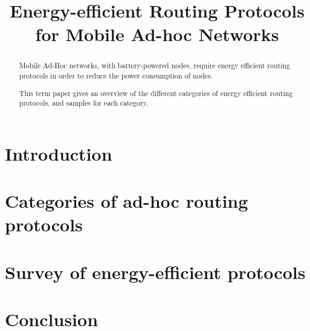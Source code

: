 \documentclass[conference]{IEEEtran}
\begin{document}
\title{Energy-efficient Routing Protocols for Mobile Ad-hoc Networks}
\author{
}

\maketitle



\begin{abstract}
Mobile Ad-Hoc networks, with battery-powered nodes, require energy efficient
routing protocols in order to reduce the power consumption of nodes.

This term paper gives an overview of the different categories of energy
efficient routing protocols, and samples for each category.
\end{abstract}

\section{Introduction}


\section{Categories of ad-hoc routing protocols}


\section{Survey of energy-efficient protocols}







\section{Conclusion}




\end{document}
